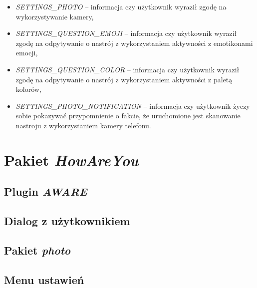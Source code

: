 \begin{itemize}
\begin{itemize}
		\item \textit{SETTINGS\_PHOTO} -- informacja czy użytkownik wyraził zgodę na wykorzystywanie kamery,
		
		\item \textit{SETTINGS\_QUESTION\_EMOJI} -- informacja czy użytkownik wyraził zgodę na odpytywanie o nastrój z wykorzystaniem aktywności z emotikonami emocji,
		
		\item \textit{SETTINGS\_QUESTION\_COLOR} -- informacja czy użytkownik wyraził zgodę na odpytywanie o nastrój z wykorzystaniem aktywności z paletą kolorów,
		
		\item \textit{SETTINGS\_PHOTO\_NOTIFICATION} -- informacja czy użytkownik życzy sobie pokazywać przypomnienie o fakcie, że uruchomione jest skanowanie nastroju z wykorzystaniem kamery telefonu.
	\end{itemize}
\end{itemize}


\section{Pakiet \textit{HowAreYou}}
\label{sec:pakietHowAreYou}


\subsection{Plugin \textit{AWARE}}


\subsection{Dialog z użytkownikiem}

\subsection{Pakiet \textit{photo}}


\subsection{Menu ustawień}